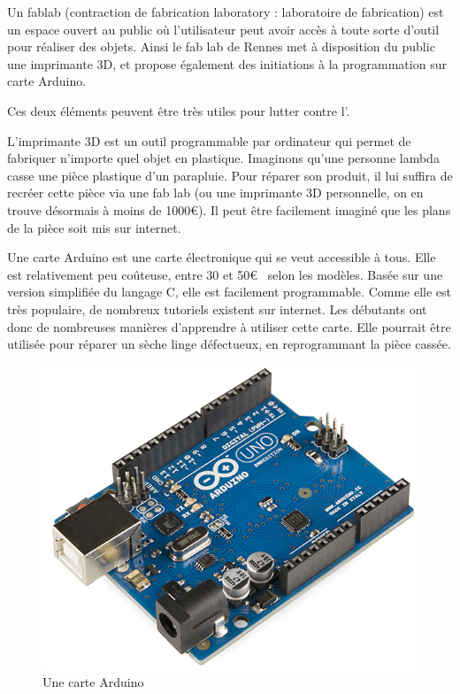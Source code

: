 Un fablab (contraction de fabrication laboratory : laboratoire de fabrication) est un espace ouvert au public où l'utilisateur peut avoir accès à  toute sorte d'outil pour réaliser des objets. Ainsi le fab lab de Rennes met à disposition du public une imprimante 3D, et propose également des initiations à la programmation sur carte Arduino.

Ces deux éléments peuvent être très utiles pour lutter contre l'\op. 

L'imprimante 3D est un outil programmable par ordinateur qui permet de fabriquer n'importe quel objet en plastique. Imaginons qu'une personne lambda casse une pièce plastique d'un parapluie. Pour réparer son produit, il lui suffira de recréer cette pièce via une fab lab (ou une imprimante 3D personnelle, on en trouve désormais à moins de 1000\euro). Il peut être facilement imaginé que les plans de la pièce soit mis sur internet. 


Une carte Arduino est une carte électronique qui se veut accessible à tous. Elle est relativement peu coûteuse, entre 30 et 50\euro~ selon les modèles. Basée sur une version simplifiée du langage C, elle est facilement programmable. Comme elle est très populaire, de nombreux tutoriels existent sur internet. Les débutants ont donc de nombreuses manières d'apprendre à utiliser cette carte. Elle pourrait être utilisée pour réparer un sèche linge défectueux, en reprogrammant la pièce cassée.

\begin{figure}
\begin{center}
\vspace{-1cm}\includegraphics[scale=0.25]{Rsc/Arduino.png} 

\caption{Une carte Arduino}
\end{center}
\end{figure}

